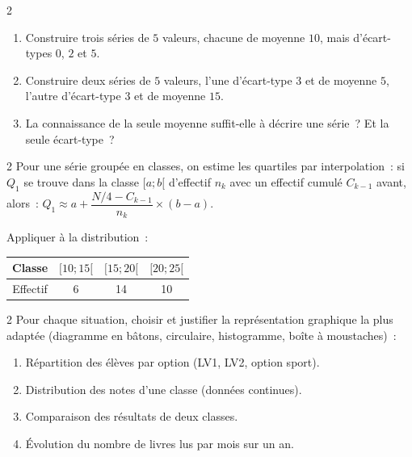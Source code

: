 \begin{exo}{2}
\begin{enumerate}
  \item Construire trois s\'eries de $5$ valeurs, chacune de moyenne $10$,
        mais d'\'ecart-types $0$, $2$ et $5$.
  \item Construire deux s\'eries de $5$ valeurs, l'une d'\'ecart-type $3$
        et de moyenne $5$, l'autre d'\'ecart-type $3$ et de moyenne $15$.
  \item La connaissance de la seule moyenne suffit-elle \`a d\'ecrire une s\'erie~?
        Et la seule \'ecart-type~?
\end{enumerate}
\end{exo}

\begin{exo}{2}
Pour une s\'erie group\'ee en classes, on estime les quartiles par interpolation~:
si $Q_1$ se trouve dans la classe $[a;b[$ d'effectif $n_k$ avec un effectif
cumul\'e $C_{k-1}$ avant, alors~:
$Q_1 \approx a + \dfrac{N/4 - C_{k-1}}{n_k}\times(b-a)$.

\noindent
Appliquer \`a la distribution~:
\begin{center}
\begin{tabular}{|c|c|c|c|}
\hline
\rowcolor{BN!10}
Classe & $[10;15[$ & $[15;20[$ & $[20;25[$ \\
\hline
Effectif & 6 & 14 & 10 \\
\hline
\end{tabular}
\end{center}
\end{exo}

\begin{exo}{2}
Pour chaque situation, choisir et justifier la repr\'esentation graphique
la plus adapt\'ee (diagramme en b\^atons, circulaire, histogramme,
bo\^ite \`a moustaches)~:
\begin{enumerate}
  \item R\'epartition des \'el\`eves par option (LV1, LV2, option sport).
  \item Distribution des notes d'une classe (donn\'ees continues).
  \item Comparaison des r\'esultats de deux classes.
  \item \'Evolution du nombre de livres lus par mois sur un an.
\end{enumerate}
\end{exo}

